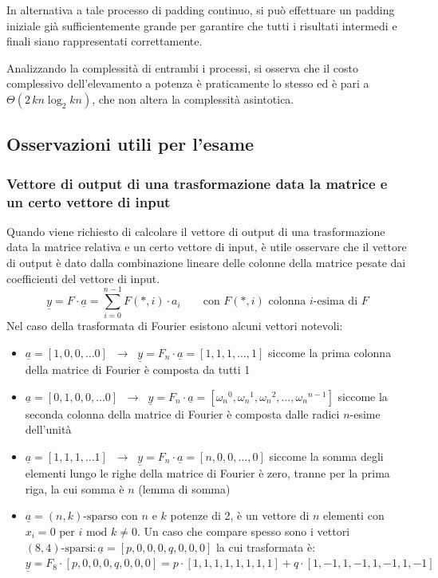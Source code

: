 In alternativa a tale processo di padding continuo, si può effettuare un padding iniziale già sufficientemente grande
per garantire che tutti i risultati intermedi e finali siano rappresentati correttamente.

Analizzando la complessità di entrambi i processi, si osserva che il costo complessivo dell'elevamento a potenza è
praticamente lo stesso ed è pari a \(\Theta(2 \, kn \log_2 kn)\), che non altera la complessità asintotica.

\subsection{Osservazioni utili per l'esame}
\subsubsection*{Vettore di output di una trasformazione data la matrice e un certo vettore di input}
Quando viene richiesto di calcolare il vettore di output di una trasformazione data la matrice relativa e un certo vettore
di input, è utile osservare che il vettore di output è dato dalla combinazione lineare delle colonne della matrice pesate
dai coefficienti del vettore di input.
\[\underline{y} = F \cdot \underline{a} = \sum_{i=0}^{n-1} F(*,i) \cdot a_i \qquad \text{con } F(*,i) \text{ colonna } i\text{-esima di } F\]
Nel caso della trasformata di Fourier esistono alcuni vettori notevoli:
\begin{itemize}
	\item \(\underline{a} = [1, 0, 0, \dots 0] \;\; \rightarrow \;\; \underline{y} = F_n \cdot \underline{a} = [1, 1, 1, \dots, 1]\)
	siccome la prima colonna della matrice di Fourier è composta da tutti 1
	\item \(\underline{a} = [0, 1, 0, 0, \dots 0] \;\; \rightarrow \;\; \underline{y} = F_n \cdot \underline{a} = [{\omega_n}^0, {\omega_n}^1, {\omega_n}^2, \dots, {\omega_n}^{n-1}]\)
	siccome la seconda colonna della matrice di Fourier è composta dalle radici \(n\)-esime dell'unità
	\item \(\underline{a} = [1, 1, 1, \dots 1] \;\; \rightarrow \;\; \underline{y} = F_n \cdot \underline{a} = [n, 0, 0, \dots, 0]\)
	siccome la somma degli elementi lungo le righe della matrice di Fourier è zero, tranne per la prima riga, la cui somma è \(n\) (lemma di somma)
	\item \(\underline{a} = (n,k)\text{-sparso}\) con \(n\) e \(k\) potenze di 2, è un vettore di \(n\) elementi con \(x_i = 0 \text{ per } i \text{ mod } k \neq 0\).
	Un caso che compare spesso sono i vettori \((8,4)\text{-sparsi} : \underline{a} = [p, 0, 0, 0, q, 0, 0, 0]\) la cui trasformata è:
	\(\underline{y} = F_8 \cdot [p, 0, 0, 0, q, 0, 0, 0] = p \cdot [1,1,1,1,1,1,1,1] + q \cdot [1,-1,1,-1,1,-1,1,-1]\)
\end{itemize}

